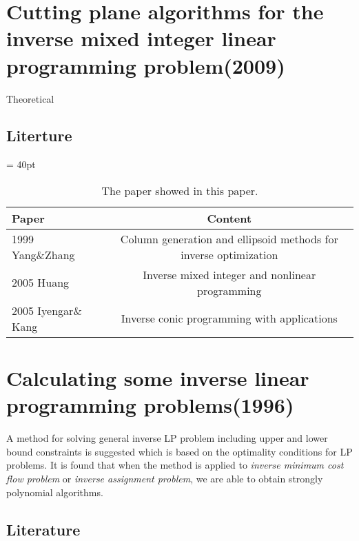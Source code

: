 \documentclass[UTF8]{article}
\begin{document}
\section{Cutting plane algorithms for the inverse mixed integer linear programming problem(2009)}

Theoretical


\subsection{Literture}


\begin{table}[ht]

 \tabcolsep = 40pt

 \small\renewcommand{}

 \caption{The paper showed in this paper.\label{tab:8}}

 {\begin{tabular}{lc}
   \hline
   Paper               & Content                                                          \\
   \hline
   1999 Yang\&Zhang    & Column generation and ellipsoid methods for inverse optimization \\
   \hline
   2005 Huang          & Inverse mixed integer and nonlinear programming                  \\
   \hline
   2005 Iyengar\& Kang & Inverse conic programming with applications                      \\
   \hline
  \end{tabular}}
 {}
\end{table}


\section{Calculating some inverse linear programming problems(1996)}

A method for solving general inverse LP problem including upper and lower bound constraints is suggested which is based on the optimality conditions for LP problems. It is found that when the method is applied to \emph{inverse minimum cost flow problem} or \emph{inverse assignment problem}, we are able to obtain strongly polynomial algorithms.


\subsection{Literature}
\end{document}
